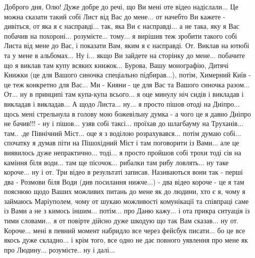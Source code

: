 Доброго дня, Олю! Дуже добре до речі, що Ви мені оте відео надіслали... Це
можна сказати такий собі Лист від Вас до мене... от начебто Ви кажете -
дивіться, от яка я є насправді... так, яка Ви є насправді... а не така, яку я
Вас побачив на похороні... розумієте... тому... я вирішив теж зробити такого
собі Листа від мене до Вас, і показати Вам, яким я є насправді. От. Виклав на
ютюбі та у мене в альбомах... Ну і... якщо Ви зайдете на сторінку до мене...
побачите що я виклав там купу всяких книжок... Бурова, Вашу монографію, Дитячі
Книжки (це для Вашого синочка спеціально підбирав...), потім, Химерний Київ -
це теж конкретно для Вас... Ми - Кияни - це для Вас та Вашого синочка разом...
От... ну в принципі там купа-купа всього... я оце минулу ніч сидів і викладав і
викладав і викладав... А щодо Листа... ну... я просто пішов отоді на Дніпро...
щось мені стрельнула в голову мою божевільну думка - а чого це я давно Дніпро
не бачив!!! - ну і пішов... узяв собі таксі... проїхав до шлагбауму на
Труханів... там.. .де Північний Міст... оце я з воділою розрахувався... потім
думаю собі... спочатку я думав піти на Пішохідний Міст і там поговорити із
Вами... але це виявилось дуже непрактично... тоді... я просто пройшов собі
трохи тоді сів на каміння біля води... там ще пісочок... рибалки там рибу
ловлять... ну таке короче... ну і от. Три відео в результаті записав.
Називаються вони так - перші два - Розмови біля Води (див посилання нижче...) -
два відео короче - це я там пояснюю щодо Ваших можливих питань до мене як до
людини, хто є я, чому я займаюсь Маріуполем, чому от шукаю можливості
комунікації та співпраці саме із Вами а не з кимось іншим... потім... про Даню
кажу... і ота прикра ситуація із тими словами... я от повірте дійсно дуже
шкодую що так Вам сказав... ну от. Короче... мені в певний момент набридло все
через фейсбук писати... бо це все якось дуже складно... і крім того, все одно
не дає повного уявлення про мене як про Людину... розумієте.. ну і далі...

